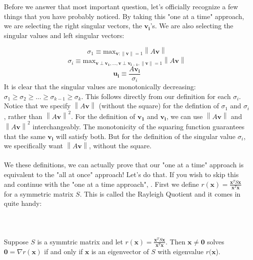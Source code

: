 \documentclass{tufte-handout}
\newcommand{\norm}[1]{\left\lVert#1\right\rVert}
\begin{document}
\noindent Before we answer that most important question, let's officially recognize a few things that you have probably noticed. By taking this "one at a time" approach, we are selecting the right singular vectors, the $\mathbf{v_i}$'s. We are also selecting the singular values and left singular vectors:

\[
\sigma_{1}\equiv\text{max}_{\mathbf{v}:\norm{\mathbf{v}}=1}\norm{A\mathbf{v}}
\]
\[
\sigma_{i}\equiv\text{max}_{\mathbf{v}\perp\mathbf{v_1},...,\mathbf{v}\perp\mathbf{v_{i-1}},\norm{\mathbf{v}}=1}\norm{A\mathbf{v}}
\]
\[
\mathbf{u_i}\equiv\frac{A\mathbf{v_i}}{\sigma_{i}}
\]
It is clear that the singular values are monotonically decreasing: $\sigma_{1}\geq\sigma_{2}\geq...\geq\sigma_{k-1}\geq\sigma_{k}$. This follows directly from our definition for each $\sigma_{i}$. Notice that we specify $\norm{A\mathbf{v}}$ (without the square) for the defintion of $\sigma_{1}$ and $\sigma_{i}$, rather than $\norm{A\mathbf{v}}^2$. For the definition of $\mathbf{v_1}$ and $\mathbf{v_i}$, we can use $\norm{A\mathbf{v}}$ and $\norm{A\mathbf{v}}^2$ interchangeably. The monotonicity of the squaring function guarantees that the same $\mathbf{v_i}$ will satisfy both. But for the definition of the singular value $\sigma_{i}$, we specifically want $\norm{A\mathbf{v}}$, without the square. \\\leavevmode\\

\noindent We these definitions, we can actually prove that our "one at a time" approach is equivalent to the "all at once" approach! Let's do that. If you wish to skip this and continue with the "one at a time approach", \hyperlink{btoaata}{}. First we define $r(\mathbf{x})=\frac{\mathbf{x}^TS\mathbf{x}}{\mathbf{x}^T\mathbf{x}}$ for a symmetric matrix $S$. This is called the Rayleigh Quotient and it comes in quite handy:\\\leavevmode\\

\\\leavevmode\\
\noindent Suppose $S$ is a symmtric matrix and let $r(\mathbf{x})=\frac{\mathbf{x}^TS\mathbf{x}}{\mathbf{x}^T\mathbf{x}}$. Then $\mathbf{x}\neq\mathbf{0}$ solves $\mathbf{0}=\nabla r(\mathbf{x})$ if and only if $\mathbf{x}$ is an eigenvector of $S$ with eigenvalue $r(\mathbf{x}$).\\\leavevmode\\
\end{document}
